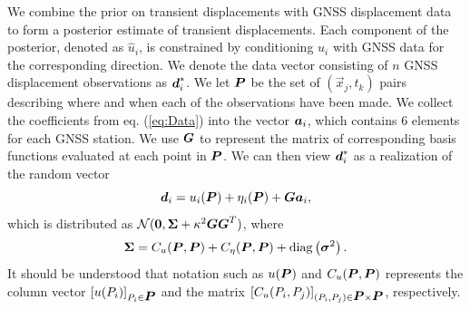 \documentclass[extra,mreferee]{gji}
\begin{document}
We combine the prior on transient displacements with GNSS displacement data to form a posterior estimate of transient displacements. Each component of the posterior, denoted as $\hat{u}_i$, is constrained by conditioning $u_i$ with GNSS data for the corresponding direction. We denote the data vector consisting of $n$ GNSS displacement observations as $\mitbf{d}^*_i$. We let $\mitbf{P}$ be the set of $(\vec{x}_j, t_k)$ pairs describing where and when each of the observations have been made. We collect the coefficients from eq. (\ref{eq:Data}) into the vector $\mitbf{a}_i$, which contains 6 elements for each GNSS station. We use $\mitbf{G}$ to represent the matrix of corresponding basis functions evaluated at each point in $\mitbf{P}$. We can then view $\mitbf{d}^*_i$ as a realization of the random vector
\begin{equation}
\mitbf{d}_i = u_i(\mitbf{P}) + \eta_i(\mitbf{P}) + \mitbf{G}\mitbf{a}_i,
\end{equation}
which is distributed as $\mathcal{N}(\mitbf{0},\mitbf{\Sigma} + \kappa^2\mitbf{G}\mitbf{G}^T)$, where
\begin{equation}\label{eq:Cd}
\mitbf{\Sigma} = C_u(\mitbf{P},\mitbf{P}) + C_\eta(\mitbf{P},\mitbf{P}) + 
              \mathrm{diag}\left(\mitbf{\sigma}^2\right).  
\end{equation}
It should be understood that notation such as $u(\mitbf{P})$ and $C_u(\mitbf{P},\mitbf{P})$ represents the column vector $[u(P_i)]_{P_i \in \mitbf{P}}$ and the matrix $[C_u(P_i,P_j)]_{(P_i,P_j) \in \mitbf{P} \times \mitbf{P}}$, respectively. 
\end{document}
